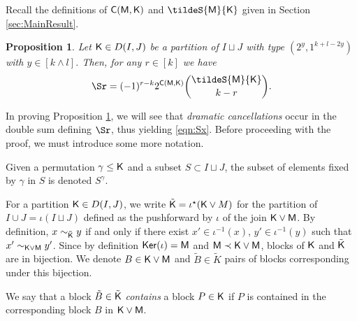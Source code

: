 \documentclass[11pt, a4paper, oneside, reqno]{amsart}
\newcommand{\sK}{{\sf K}}
\newcommand{\setK}{{D(I,J)}}
\newcommand{\sM}{{\sf M}}
\newtheorem{proposition}[theorem]{Proposition}
\theoremstyle{remark}
\theoremstyle{definition}
\numberwithin{equation}{section}
\begin{document}
Recall the definitions of ${\sf C}({\sf M}, {\sf K})$ and $\tildeS{{\sf M}}{\sf K}$ given in Section \ref{sec:MainResult}.
\begin{proposition} \label{prop:FormulePourSx}
	Let ${\sf K} \in \setK$ be a partition of $I\sqcup J$ with type $(2^y,1^{k+l-2y})$  with $y\in [k\wedge l]$. Then, for any $r\in [k]$ we have
	\begin{equation}
		\label{eqn:Sx}
		\Sr= (-1)^{r-k}2^{{\sf C}({\sf M}, {\sf K})}\binom{\tildeS{\sf M}{\sf K}}{k-r}.
	\end{equation}
\end{proposition}


In proving Proposition \ref{prop:FormulePourSx}, we will see that \emph{dramatic cancellations} occur in the double sum defining $\Sr$, thus yielding \eqref{eqn:Sx}.
Before proceeding with the proof, we must introduce some more notation.

Given a permutation $\gamma \leq {\sf K}$ and a subset $S \subset I\sqcup J$, the subset of elements fixed by $\gamma$ in $S$ is denoted $S^\gamma$.

For a partition ${\sf K} \in D(I,J)$, we write $\tilde{\sf K}=\iota^{\star}({\sf K}\vee M)$ for the partition of $I\cup J = \iota(I\sqcup J)$ defined as the pushforward by ${\iota}$ of the join ${\sf K}\vee {\sf M}$. By definition, $x \sim_{\sf \tilde{K}} y$ if and only if there exist $x'\in {\iota}^{-1}(x)$, $y'\in {\iota^{-1}(y)}$ such that $x'\sim_{\sK \vee \sM} y'$.
Since by definition ${\sf Ker}(\iota) = \sM$ and $\sM \prec \sK \vee \sM$, blocks of $\sK$ and $\tilde\sK$ are in bijection. We  denote $B \in {\sf K}\vee \sM$ and $\tilde{B} \in \tilde{K}$ pairs of blocks corresponding under this bijection.

We say that a block
$\tilde{B}\in \tilde{\sf K}$ \emph{contains} a block $P\in {\sf K}$ if $P$ is contained in the corresponding block $B$ in $\sK \vee \sM$.
\end{document}

